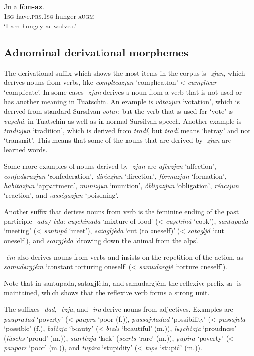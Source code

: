 \ea
\label{}
\\
\gll Ju a \textbf{fòm-az}.\\
\textsc{1sg} have.\textsc{prs.1sg} hunger-\textsc{augm}\\
\glt `I am hungry as wolves.'
\z


\subsection{Adnominal derivational morphemes}
The derivational suffix which shows the most items in the corpus is -\textit{zjun}, which derives nouns from verbs, like \textit{complicazjun} `complication' < \textit{cumplicar} `complicate'. In some cases -\textit{zjun} derives a noun from a verb that is not used or has another meaning in Tuatschin. An example is \textit{vòtazjun} `votation', which is derived from standard Sursilvan \textit{votar}, but the verb that is used for `vote' is \textit{vuṣchá}, in Tuatschin as well as in normal Sursilvan speech. Another example is \textit{tradizjun} `tradition', which is derived from \textit{tradí}, but \textit{tradí} means `betray' and not `transmit'. This means that some of the nouns that are derived by -\textit{zjun} are learned words.

Some more examples of nouns derived by -\textit{zjun} are \textit{afèczjun} `affection', \textit{confadarazjun} `confederation', \textit{dirèczjun} `direction', \textit{fòrmazjun} `formation', \textit{habitazjun} `appartment', \textit{munizjun} `munition', \textit{òbligazjun} `obligation', \textit{réaczjun} `reaction', and \textit{tussègazjun} `poisoning'.

Another suffix that derives nouns from verb is the feminine ending of the past participle \textit{-ada/-èda}: \textit{cuṣchinada} `mixture of food' (< \textit{cuṣchiná} `cook'), \textit{santupada} `meeting' (< \textit{santupá} `meet'), \textit{satagljèda} `cut (to oneself)' (< \textit{satagljá} `cut oneself'), and \textit{scargjèda} `drowing down the animal from the alps'.

-\textit{ém} also derives nouns from verbs and insists on the repetition of the action, as \textit{samudargjém} `constant torturing oneself' (< \textit{samudargjè} `torture oneself').

Note that in santupada, satagjlèda, and samudargjém the reflexive prefix sa- is maintained, which shows that the reflexive verb forms a strong unit.

The suffixes -\textit{dad}, -\textit{èzja}, and -\textit{ira} derive nouns from adjectives. Examples are \textit{paupradad} `poverty' (< \textit{paupra} `poor (f.)), \textit{pussajvladad} `possibility' (< \textit{pussajvla} `possible' (f.), \textit{balèzja} `beauty' (< \textit{bials} `beautiful' (m.)), \textit{luṣchèzja} `proudness' (\textit{lùschs} `proud' (m.)), \textit{scartèzja} `lack' (\textit{scarts} `rare' (m.)), \textit{pupira} `poverty' (< \textit{paupars} `poor' (m.)), and \textit{tupira} `stupidity' (< \textit{tups} `stupid' (m.)).

